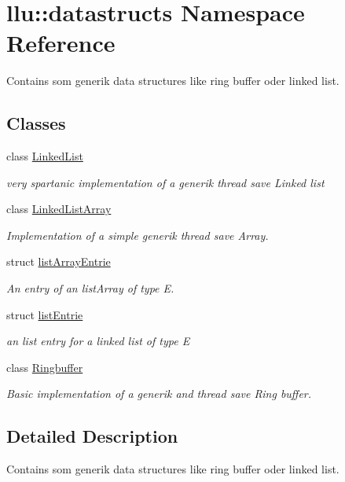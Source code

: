 \hypertarget{namespacellu_1_1datastructs}{\section{llu\+:\+:datastructs Namespace Reference}
\label{namespacellu_1_1datastructs}
}


Contains som generik data structures like ring buffer oder linked list.  


\subsection*{Classes}
\begin{DoxyCompactItemize}
\item 
class \hyperlink{classllu_1_1datastructs_1_1_linked_list}{Linked\+List}
\begin{DoxyCompactList}\small\item\em very spartanic implementation of a generik thread save Linked list \end{DoxyCompactList}\item 
class \hyperlink{classllu_1_1datastructs_1_1_linked_list_array}{Linked\+List\+Array}
\begin{DoxyCompactList}\small\item\em Implementation of a simple generik thread save Array. \end{DoxyCompactList}\item 
struct \hyperlink{structllu_1_1datastructs_1_1list_array_entrie}{list\+Array\+Entrie}
\begin{DoxyCompactList}\small\item\em An entry of an list\+Array of type E. \end{DoxyCompactList}\item 
struct \hyperlink{structllu_1_1datastructs_1_1list_entrie}{list\+Entrie}
\begin{DoxyCompactList}\small\item\em an list entry for a linked list of type E \end{DoxyCompactList}\item 
class \hyperlink{classllu_1_1datastructs_1_1_ringbuffer}{Ringbuffer}
\begin{DoxyCompactList}\small\item\em Basic implementation of a generik and thread save Ring buffer. \end{DoxyCompactList}\end{DoxyCompactItemize}


\subsection{Detailed Description}
Contains som generik data structures like ring buffer oder linked list. 